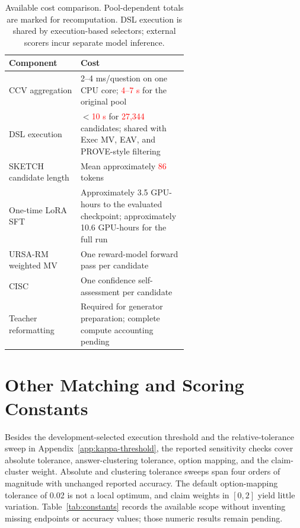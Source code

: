 \documentclass{article}
\newcommand{\recheck}[1]{\textcolor{red}{#1}}
\begin{document}
\begin{table}[h]
\centering
\caption{Available cost comparison. Pool-dependent totals are marked for recomputation. DSL execution is shared by execution-based selectors; external scorers incur separate model inference.}
\label{tab:costs}
\small
\begin{tabular}{lp{0.60\linewidth}}
\toprule
Component & Cost \\
\midrule
CCV aggregation & 2--4 ms/question on one CPU core; \recheck{4--7 s} for the original pool \\
DSL execution & $<$\recheck{10 s} for \recheck{27,344} candidates; shared with Exec MV, EAV, and PROVE-style filtering \\
SKETCH candidate length & Mean approximately \recheck{86} tokens \\
One-time LoRA SFT & Approximately 3.5 GPU-hours to the evaluated checkpoint; approximately 10.6 GPU-hours for the full run \\
URSA-RM weighted MV & One reward-model forward pass per candidate \\
CISC & One confidence self-assessment per candidate \\
Teacher reformatting & Required for generator preparation; complete compute accounting pending \\
\bottomrule
\end{tabular}
\end{table}

\section{Other Matching and Scoring Constants}
\label{app:constants}

Besides the development-selected execution threshold and the relative-tolerance sweep in Appendix~\ref{app:kappa-threshold}, the reported sensitivity checks cover absolute tolerance, answer-clustering tolerance, option mapping, and the claim-cluster weight. Absolute and clustering tolerance sweeps span four orders of magnitude with unchanged reported accuracy. The default option-mapping tolerance of 0.02 is not a local optimum, and claim weights in $[0,2]$ yield little variation. Table~\ref{tab:constants} records the available scope without inventing missing endpoints or accuracy values; those numeric results remain pending.
\end{document}
